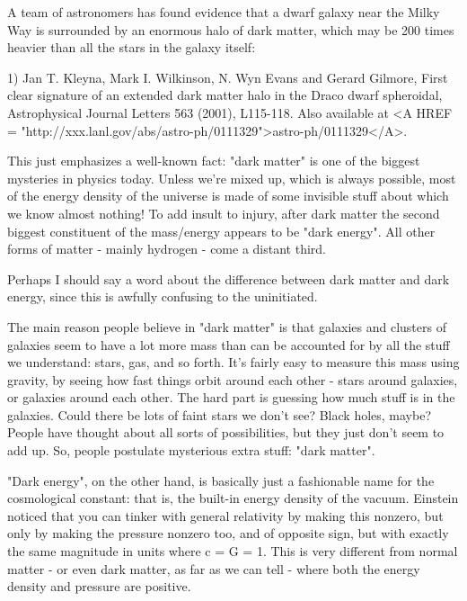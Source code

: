 



A team of astronomers has found evidence that a dwarf galaxy near the
Milky Way is surrounded by an enormous halo of dark matter, which may be
200 times heavier than all the stars in the galaxy itself:

1) Jan T. Kleyna, Mark I. Wilkinson, N. Wyn Evans and Gerard Gilmore,
First clear signature of an extended dark matter halo in the Draco 
dwarf spheroidal, Astrophysical Journal Letters 563 (2001), L115-118.
Also available at <A HREF = "http://xxx.lanl.gov/abs/astro-ph/0111329">astro-ph/0111329</A>.  

This just emphasizes a well-known fact: "dark matter" is one
of the biggest mysteries in physics today.  Unless we're mixed up, which
is always possible, most of the energy density of the universe is made
of some invisible stuff about which we know almost nothing!  To add
insult to injury, after dark matter the second biggest constituent of
the mass/energy appears to be "dark energy".  All other forms
of matter - mainly hydrogen - come a distant third.

Perhaps I should say a word about the difference between dark matter
and dark energy, since this is awfully confusing to the uninitiated.

The main reason people believe in "dark matter" is that galaxies and
clusters of galaxies seem to have a lot more mass than can be accounted
for by all the stuff we understand: stars, gas, and so forth. It's
fairly easy to measure this mass using gravity, by seeing how fast
things orbit around each other - stars around galaxies, or galaxies
around each other.  The hard part is guessing how much stuff is in the
galaxies.  Could there be lots of faint stars we don't see?  Black
holes, maybe?  People have thought about all sorts of possibilities, but
they just don't seem to add up.  So, people postulate mysterious extra
stuff: "dark matter".

"Dark energy", on the other hand, is basically just a fashionable name
for the cosmological constant: that is, the built-in energy density of
the vacuum.  Einstein noticed that you can tinker with general
relativity by making this nonzero, but only by making the pressure
nonzero too, and of opposite sign, but with exactly the same magnitude
in units where c = G = 1.  This is very different from normal matter - 
or even dark matter, as far as we can tell - where both the energy density
and pressure are positive.

